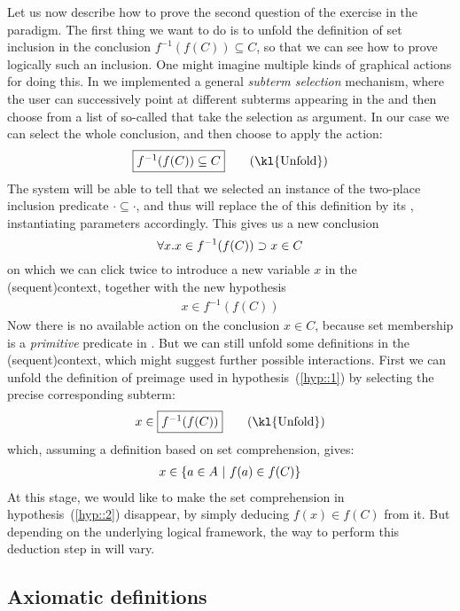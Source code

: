 \AP
Let us now describe how to prove the second question of the exercise in the
 paradigm. The first thing we want to do is to unfold the definition of
set inclusion in the conclusion $f^{-1}(f(C)) \subseteq C$, so that we can see
how to prove logically such an inclusion. One might imagine multiple kinds of
graphical actions for doing this. In  we implemented a general
\emph{subterm selection} mechanism, where the user can successively point at
different subterms appearing in the  and then choose from a list of
so-called  that take the selection as argument. In our
case we can select the whole conclusion, and then choose to apply the
 action:
$$\select{f^{-1}(f(C)) \subseteq C} \qquad \text{(\kl{Unfold})}$$
The system will be able to tell that we selected an instance of the two-place
inclusion predicate $\cdot \subseteq \cdot$, and thus will replace the 
of this definition by its , instantiating parameters accordingly. This
gives us a new conclusion
$$\forall x. x \in f^{-1}(f(C)) \supset x \in C$$
on which we can click twice to introduce a new variable $x$ in the \kl(sequent){context},
together with the new hypothesis
\begin{gather}
  x \in f^{-1}(f(C)) \label{hyp::1}
\end{gather}
Now there is no available action on the conclusion $x \in C$, because set
membership is a \emph{primitive} predicate in . But we can still
unfold some definitions in the \kl(sequent){context}, which might suggest
further possible interactions. First we can unfold the definition of preimage
used in hypothesis~(\ref{hyp::1}) by selecting the precise corresponding
subterm:
$$x \in \select{f^{-1}(f(C))} \qquad \text{(\kl{Unfold})}$$
which, assuming a definition based on set comprehension, gives:
\begin{gather}
  x \in \left\{a \in A ~\middle|~ f(a) \in f(C)\right\} \label{hyp::2}
\end{gather}
At this stage, we would like to make the set comprehension in
hypothesis~(\ref{hyp::2}) disappear, by simply deducing $f(x) \in f(C)$ from it.
But depending on the underlying logical framework, the way to perform this
deduction step in  will vary.

\subsection{Axiomatic definitions}

